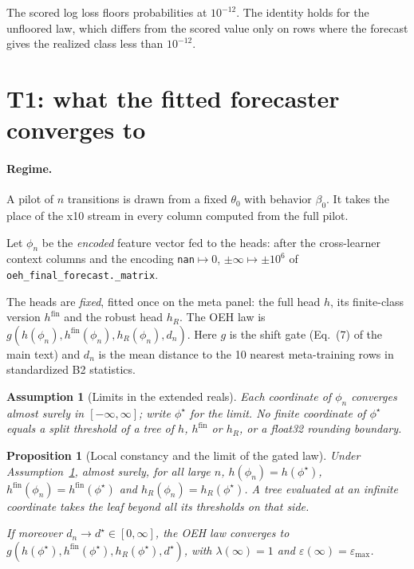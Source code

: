 \documentclass[10pt]{article}
\newtheorem{proposition}{Proposition}
\newtheorem{assumption}{Assumption}
\begin{document}
\noindent The scored log loss floors probabilities at $10^{-12}$. The identity holds for the unfloored law, which differs from the scored value only on rows where the forecast gives the realized class less than $10^{-12}$.

\section{T1: what the fitted forecaster converges to}

\paragraph{Regime.} A pilot of $n$ transitions is drawn from a fixed $\theta_0$ with behavior $\beta_0$. It takes the place of the x10 stream in every column computed from the full pilot.

Let $\phi_n$ be the \emph{encoded} feature vector fed to the heads: after the cross-learner context columns and the encoding \texttt{nan}$\mapsto0$, $\pm\infty\mapsto\pm10^6$ of \texttt{oeh\_final\_forecast.\_matrix}.

The heads are \emph{fixed}, fitted once on the meta panel: the full head $h$, its finite-class version $h^{\mathrm{fin}}$ and the robust head $h_R$. The OEH law is $g(h(\phi_n),h^{\mathrm{fin}}(\phi_n),h_R(\phi_n),d_n)$. Here $g$ is the shift gate (Eq.~(7) of the main text) and $d_n$ is the mean distance to the 10 nearest meta-training rows in standardized B2 statistics.

\begin{assumption}[Limits in the extended reals]\label{as:feat}
Each coordinate of $\phi_n$ converges almost surely in $[-\infty,\infty]$; write $\phi^\star$ for the limit. No finite coordinate of $\phi^\star$ equals a split threshold of a tree of $h$, $h^{\mathrm{fin}}$ or $h_R$, or a float32 rounding boundary.
\end{assumption}

\begin{proposition}[Local constancy and the limit of the gated law]\label{prop:t1}
Under Assumption~\ref{as:feat}, almost surely, for all large $n$, $h(\phi_n)=h(\phi^\star)$, $h^{\mathrm{fin}}(\phi_n)=h^{\mathrm{fin}}(\phi^\star)$ and $h_R(\phi_n)=h_R(\phi^\star)$. A tree evaluated at an infinite coordinate takes the leaf beyond all its thresholds on that side.

If moreover $d_n\to d^\star\in[0,\infty]$, the OEH law converges to $g(h(\phi^\star),h^{\mathrm{fin}}(\phi^\star),h_R(\phi^\star),d^\star)$, with $\lambda(\infty)=1$ and $\varepsilon(\infty)=\varepsilon_{\max}$.
\end{proposition}
\end{document}

